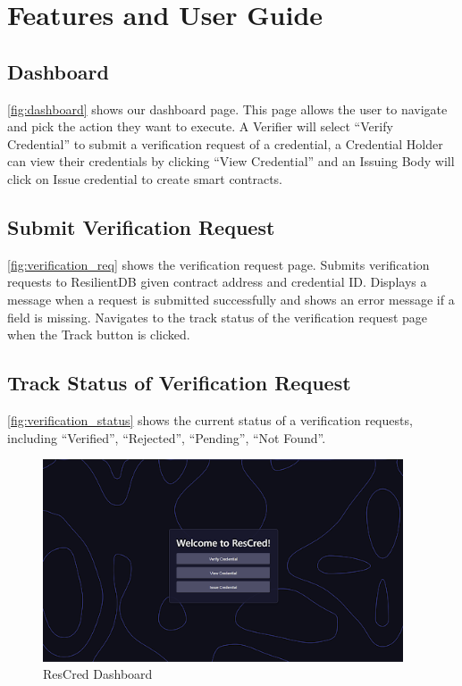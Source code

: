 \section{Features and User Guide}

\subsection{Dashboard}

\autoref{fig:dashboard} shows our dashboard page. This page allows the user to navigate and pick the action they want to execute. A Verifier will select “Verify Credential” to submit a verification request of a credential, a Credential Holder can view their credentials by clicking “View Credential” and an Issuing Body will click on Issue credential to create smart contracts.

\subsection{Submit Verification Request}

\autoref{fig:verification_req} shows the verification request page. 
Submits verification requests to ResilientDB given contract address and credential ID. Displays a message when a request is submitted successfully and shows an error message if a field is missing. Navigates to the track status of the verification request page when the Track button is clicked.

\subsection{Track Status of Verification Request}

\autoref{fig:verification_status} shows the current status of a verification requests, including
``Verified'', ``Rejected'', ``Pending'', ``Not Found''.

\begin{figure}
    \begin{center}
        \includegraphics[width=0.95\textwidth]{img/dashboard.png}
    \end{center}
    \caption{ResCred Dashboard}\label{fig:dashboard}
\end{figure}

